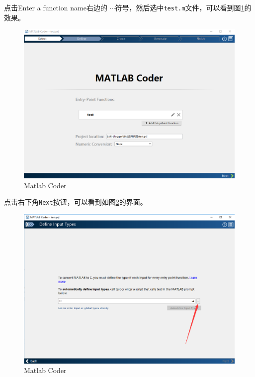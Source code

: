 \documentclass[]{ctexbook}
\begin{document}
点击Enter a function name右边的
\(\cdots\)符号，然后选中\texttt{test.m}文件，可以看到图\ref{fig:coder2}的效果。

\begin{figure}

{\centering \includegraphics[width=0.95\linewidth]{img/coder2} 

}

\caption{Matlab Coder}\label{fig:coder2}
\end{figure}

点击右下角\texttt{Next}按钮，可以看到如图\ref{fig:coder3}的界面。

\begin{figure}

{\centering \includegraphics[width=0.95\linewidth]{img/coder3} 

}

\caption{Matlab Coder}\label{fig:coder3}
\end{figure}
\end{document}
